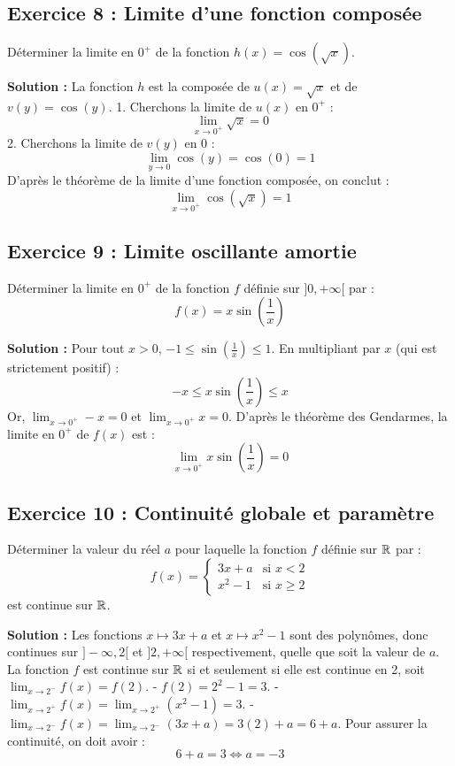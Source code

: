 \subsection*{Exercice 8 : Limite d'une fonction composée}
Déterminer la limite en $0^+$ de la fonction $h(x) = \cos(\sqrt{x})$.

\textbf{Solution :}
La fonction $h$ est la composée de $u(x) = \sqrt{x}$ et de $v(y) = \cos(y)$.
1. Cherchons la limite de $u(x)$ en $0^+$ :
   \[
   \lim_{x \to 0^+} \sqrt{x} = 0
   \]
2. Cherchons la limite de $v(y)$ en 0 :
   \[
   \lim_{y \to 0} \cos(y) = \cos(0) = 1
   \]
D'après le théorème de la limite d'une fonction composée, on conclut :
\[
\lim_{x \to 0^+} \cos(\sqrt{x}) = 1
\]

\subsection*{Exercice 9 : Limite oscillante amortie}
Déterminer la limite en $0^+$ de la fonction $f$ définie sur $]0, +\infty[$ par :
\[
f(x) = x \sin\left(\frac{1}{x}\right)
\]

\textbf{Solution :}
Pour tout $x > 0$, $-1 \le \sin\left(\frac{1}{x}\right) \le 1$.
En multipliant par $x$ (qui est strictement positif) :
\[
-x \le x \sin\left(\frac{1}{x}\right) \le x
\]
Or, $\lim_{x \to 0^+} -x = 0$ et $\lim_{x \to 0^+} x = 0$.
D'après le théorème des Gendarmes, la limite en $0^+$ de $f(x)$ est :
\[
\lim_{x \to 0^+} x \sin\left(\frac{1}{x}\right) = 0
\]

\subsection*{Exercice 10 : Continuité globale et paramètre}
Déterminer la valeur du réel $a$ pour laquelle la fonction $f$ définie sur $\mathbb{R}$ par :
\[
f(x) = 
\begin{cases} 
3x + a & \text{si } x < 2 \\
x^2 - 1 & \text{si } x \ge 2
\end{cases}
\]
est continue sur $\mathbb{R}$.

\textbf{Solution :}
Les fonctions $x \mapsto 3x+a$ et $x \mapsto x^2-1$ sont des polynômes, donc continues sur $]-\infty, 2[$ et $]2, +\infty[$ respectivement, quelle que soit la valeur de $a$.
La fonction $f$ est continue sur $\mathbb{R}$ si et seulement si elle est continue en 2, soit $\lim_{x \to 2^-} f(x) = f(2)$.
- $f(2) = 2^2 - 1 = 3$.
- $\lim_{x \to 2^+} f(x) = \lim_{x \to 2^+} (x^2-1) = 3$.
- $\lim_{x \to 2^-} f(x) = \lim_{x \to 2^-} (3x+a) = 3(2) + a = 6 + a$.
Pour assurer la continuité, on doit avoir :
\[
6 + a = 3 \iff a = -3
\]

